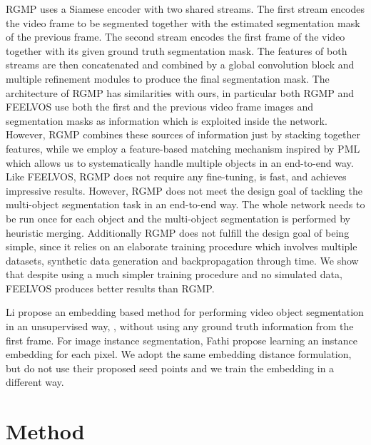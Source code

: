 \documentclass[10pt,twocolumn,letterpaper]{article}
\newcommand{\PAR}[1]{\vskip1pt \noindent {\bf #1~}}
\begin{document}
RGMP \cite{Oh18CVPR} uses a Siamese encoder with two shared streams. The first stream encodes the video frame to be segmented together with the estimated segmentation mask of the previous frame. The second stream encodes the first frame of the video together with its given ground truth segmentation mask. The features of both streams are then concatenated and combined by a global convolution block and multiple refinement modules to produce the final segmentation mask. The architecture of RGMP has similarities with ours, in particular both RGMP and FEELVOS use both the first and the previous video frame images and segmentation masks as information which is exploited inside the network. However, RGMP combines these sources of information just by stacking together features, while we employ a feature-based matching mechanism inspired by PML \cite{Chen18CVPR} which allows us to systematically handle multiple objects in an end-to-end way.
Like FEELVOS, RGMP does not require any fine-tuning, is fast, and achieves impressive results. However, RGMP does not meet the design goal of tackling the multi-object segmentation task in an end-to-end way. The whole network needs to be run once for each object and the multi-object segmentation is performed by heuristic merging. Additionally RGMP does not fulfill the design goal of being simple, since it relies on an elaborate training procedure which involves multiple datasets, synthetic data generation and backpropagation through time. We show that despite using a much simpler training procedure and no simulated data, FEELVOS produces better results than RGMP.

\PAR{Instance Embedding Learning.}
Li \etal \cite{Li18CVPR} propose an embedding based method for performing video object segmentation in an unsupervised way, \ie, without using any ground truth information from the first frame.
For image instance segmentation, Fathi \etal \cite{Fathi17Arxiv} propose learning an instance embedding for each pixel. We adopt the same embedding distance formulation, but do not use their proposed seed points and we train the embedding in a different way. 

\section{Method}
\end{document}
